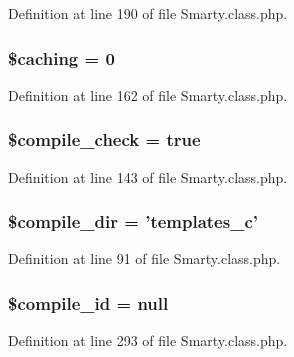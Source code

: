 \-Definition at line 190 of file \-Smarty.\-class.\-php.

\hypertarget{class_smarty_aa36073c4cda5c97981a5b99ca92208be}{
\subsubsection[{\$caching}]{\setlength{\rightskip}{0pt plus 5cm}\$caching = 0}}\label{class_smarty_aa36073c4cda5c97981a5b99ca92208be}


\-Definition at line 162 of file \-Smarty.\-class.\-php.

\hypertarget{class_smarty_ab9662ea355e8e7c1f47ef0e568147512}{
\subsubsection[{\$compile\-\_\-check}]{\setlength{\rightskip}{0pt plus 5cm}\$compile\-\_\-check = true}}\label{class_smarty_ab9662ea355e8e7c1f47ef0e568147512}


\-Definition at line 143 of file \-Smarty.\-class.\-php.

\hypertarget{class_smarty_a43c2cf2ae254b7b9c45079b63e453c4e}{
\subsubsection[{\$compile\-\_\-dir}]{\setlength{\rightskip}{0pt plus 5cm}\$compile\-\_\-dir = 'templates\-\_\-c'}}\label{class_smarty_a43c2cf2ae254b7b9c45079b63e453c4e}


\-Definition at line 91 of file \-Smarty.\-class.\-php.

\hypertarget{class_smarty_a4c29af6f98e3049de95861b01a7bb00d}{
\subsubsection[{\$compile\-\_\-id}]{\setlength{\rightskip}{0pt plus 5cm}\$compile\-\_\-id = null}}\label{class_smarty_a4c29af6f98e3049de95861b01a7bb00d}


\-Definition at line 293 of file \-Smarty.\-class.\-php.

